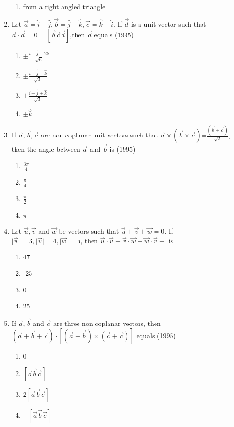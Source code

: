 \documentclass[12pt]{article}
\providecommand{\brak}[1]{\ensuremath{\left(#1\right)}}
\providecommand{\sbrak}[1]{\ensuremath{{}\left[#1\right]}}
\begin{document}
\begin{enumerate}
\begin{enumerate}
\item from a right angled triangle
\end{enumerate}
\item Let $\vec{a}=\hat{i}-\hat{j},\vec{b}=\hat{j}-\hat{k},\vec{c}=\hat{k}-\hat{i}$. If $\vec{d}$ is a unit vector such that $\vec{a}\cdot\vec{d}=0=\sbrak{\vec{b} \vec{c} 
\vec{d}}$,then $\vec{d}$ equals (1995)
\begin{enumerate}	
\item $\pm\frac{\hat{i}+\hat{j}-2\hat{k}}{\sqrt{6}}$
\item $\pm\frac{\hat{i}+\hat{j}-\hat{k}}{\sqrt{3}}$
\item $\pm\frac{\hat{i}+\hat{j}+\hat{k}}{\sqrt{3}}$
\item $\pm\hat{k}$
\end{enumerate}
\item If $\vec{a},\vec{b},\vec{c}$ are non coplanar unit vectors such that $\vec{a}\times\brak{\vec{b}\times\vec{c}}$=$\frac{\brak{\vec{b}+\vec{c}}}{\sqrt{2}}$, then the angle between $\vec{a}$ and $\vec{b}$ is  (1995)
\begin{enumerate}	
\item $\frac{3\pi}{4}$
\item $\frac{\pi}{4}$
\item $\frac{\pi}{2}$
\item $\pi$
\end{enumerate}
\item Let $\vec{u},\vec{v}$ and $\vec{w}$ be vectors such that $\vec{u}+\vec{v}+\vec{w}=0$. If $\mid\vec{u}\mid=3,\mid\vec{v}\mid=4,\mid\vec{w}\mid=5$, then $\vec{u}\cdot\vec{v}+\vec{v}\cdot\vec{w}+\vec{w}\cdot\vec{u}+$ is
\begin{enumerate}	
\item 47
\item -25
\item 0
\item 25
\end{enumerate}
\item If $\vec{a},\vec{b}$ and $\vec{c}$  are three non coplanar vectors, then $\brak{\vec{a}+\vec{b}+\vec{c}}\cdot\sbrak{\brak{\vec{a}+\vec{b}}\times\brak{\vec{a}+\vec{c}}}$ equals  (1995)
\begin{enumerate}	
\item 0
\item $\sbrak{\vec{a} \vec{b} \vec{c}}$
\item $2\sbrak{\vec{a} \vec{b} \vec{c}}$
\item $-\sbrak{\vec{a} \vec{b} \vec{c}}$
\end{enumerate}

\end{enumerate}
\end{document}
